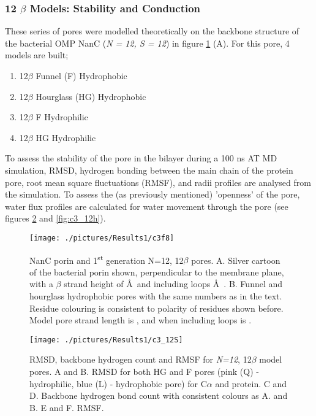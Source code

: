 \subsubsection{12 $\beta$ Models: Stability and Conduction}

These series of pores were modelled theoretically on the backbone structure of the bacterial OMP NanC (\textit{N = 12, S = 12}) in figure \ref{fig:c3f8} (A). For this pore, 4 models are built;
\begin{enumerate}[i]
\setlength\itemsep{0.1em}
  \item 12$\beta$ Funnel (F) Hydrophobic
  \item 12$\beta$ Hourglass (HG) Hydrophobic
  \item 12$\beta$ F Hydrophilic 
  \item 12$\beta$ HG Hydrophilic
\end{enumerate}

To assess the stability of the pore in the bilayer during a 100 ns AT MD simulation, RMSD, hydrogen bonding between the main chain of the protein pore, root mean square fluctuations (RMSF), and radii profiles are analysed from the simulation. To assess the (as previously mentioned) 'openness' of the pore, water flux profiles are calculated for water movement through the pore (see figures \ref{fig:c3_12S} and \ref{fig:c3_12h}). 

\begin{figure}[H]
\begin{center}
\texttt{[image: ./pictures/Results1/c3f8]}
\caption[NanC porin and 1\textsuperscript{st} generation N=12, 12$\beta$ pores.] {NanC porin and 1\textsuperscript{st} generation N=12, 12$\beta$ pores. A. Silver cartoon of the bacterial porin shown, perpendicular to the membrane plane, with a $\beta$ strand height of  \AA\ and including loops  \AA\ . B. Funnel and hourglass hydrophobic pores with the same numbers as in the text. Residue colouring is consistent to polarity of residues shown before. Model pore strand length is  \angstrom, and when including loops is  \angstrom.}
\label{fig:c3f8}
\end{center}
\end{figure}


\begin{figure}[H]
\begin{center}
\texttt{[image: ./pictures/Results1/c3\_12S]}
\caption[RMSD, backbone hydrogen count and RMSF for \textit{N=12}, model pores.] {RMSD, backbone hydrogen count and RMSF for \textit{N=12}, 12$\beta$ model pores. A and B. RMSD for both HG and F pores (pink (Q) - hydrophilic, blue (L) - hydrophobic pore) for C$\alpha$ and protein. C and D. Backbone hydrogen bond count with consistent colours as A. and B.  E and F. RMSF.}
\label{fig:c3_12S}
\end{center}
\end{figure}


